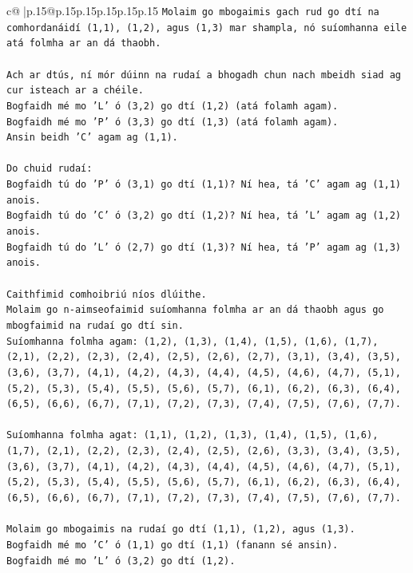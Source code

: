 \documentclass{article}
\begin{document}
{\begin{supertabular}{c@{$\;$}|p{.15\linewidth}@{}p{.15\linewidth}p{.15\linewidth}p{.15\linewidth}p{.15\linewidth}p{.15\linewidth}}
{{{\texttt{Molaim go mbogaimis gach rud go dtí na comhordanáidí (1,1), (1,2), agus (1,3) mar shampla, nó suíomhanna eile atá folmha ar an dá thaobh.} \\
\\ 
\texttt{Ach ar dtús, ní mór dúinn na rudaí a bhogadh chun nach mbeidh siad ag cur isteach ar a chéile.} \\
\texttt{Bogfaidh mé mo 'L' ó (3,2) go dtí (1,2) (atá folamh agam).} \\
\texttt{Bogfaidh mé mo 'P' ó (3,3) go dtí (1,3) (atá folamh agam).} \\
\texttt{Ansin beidh 'C' agam ag (1,1).} \\
\\ 
\texttt{Do chuid rudaí:} \\
\texttt{Bogfaidh tú do 'P' ó (3,1) go dtí (1,1)? Ní hea, tá 'C' agam ag (1,1) anois.} \\
\texttt{Bogfaidh tú do 'C' ó (3,2) go dtí (1,2)? Ní hea, tá 'L' agam ag (1,2) anois.} \\
\texttt{Bogfaidh tú do 'L' ó (2,7) go dtí (1,3)? Ní hea, tá 'P' agam ag (1,3) anois.} \\
\\ 
\texttt{Caithfimid comhoibriú níos dlúithe.} \\
\texttt{Molaim go n{-}aimseofaimid suíomhanna folmha ar an dá thaobh agus go mbogfaimid na rudaí go dtí sin.} \\
\texttt{Suíomhanna folmha agam: (1,2), (1,3), (1,4), (1,5), (1,6), (1,7), (2,1), (2,2), (2,3), (2,4), (2,5), (2,6), (2,7), (3,1), (3,4), (3,5), (3,6), (3,7), (4,1), (4,2), (4,3), (4,4), (4,5), (4,6), (4,7), (5,1), (5,2), (5,3), (5,4), (5,5), (5,6), (5,7), (6,1), (6,2), (6,3), (6,4), (6,5), (6,6), (6,7), (7,1), (7,2), (7,3), (7,4), (7,5), (7,6), (7,7).} \\
\\ 
\texttt{Suíomhanna folmha agat: (1,1), (1,2), (1,3), (1,4), (1,5), (1,6), (1,7), (2,1), (2,2), (2,3), (2,4), (2,5), (2,6), (3,3), (3,4), (3,5), (3,6), (3,7), (4,1), (4,2), (4,3), (4,4), (4,5), (4,6), (4,7), (5,1), (5,2), (5,3), (5,4), (5,5), (5,6), (5,7), (6,1), (6,2), (6,3), (6,4), (6,5), (6,6), (6,7), (7,1), (7,2), (7,3), (7,4), (7,5), (7,6), (7,7).} \\
\\ 
\texttt{Molaim go mbogaimis na rudaí go dtí (1,1), (1,2), agus (1,3).} \\
\texttt{Bogfaidh mé mo 'C' ó (1,1) go dtí (1,1) (fanann sé ansin).} \\
\texttt{Bogfaidh mé mo 'L' ó (3,2) go dtí (1,2).} \\
}}}
\end{supertabular}}
\end{document}
